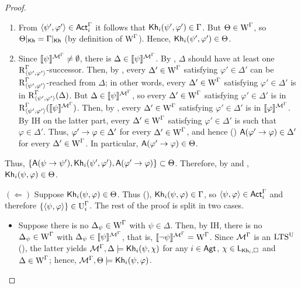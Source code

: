 \begin{proof}
\begin{itemize}
\begin{itemize}
\begin{enumerate}
    \item From $\langle \psi',\varphi' \rangle \in {\rm \sf Act}^\Gamma_i$ it follows that ${\sf Kh}_i(\psi',\varphi') \in \Gamma$.
    But $\Theta \in \operatorname{W}^\Gamma$, so $\Theta\vert_{{\sf Kh}} = \Gamma\vert_{{\sf Kh}}$ (by definition of $\operatorname{W}^\Gamma$).
    Hence, ${\sf Kh}_i(\psi',\varphi') \in \Theta$.

    \item Since $\llbracket \psi \rrbracket^{\mathcal{M}^\Gamma} \neq \emptyset$, there is $\Delta \in \llbracket \psi \rrbracket^{\mathcal{M}^\Gamma}$.
    By , $\Delta$ should have at least one $\operatorname{R}^\Gamma_{\langle \psi',\varphi' \rangle}$-successor.
    Then, by , every $\Delta' \in \operatorname{W}^\Gamma$ satisfying $\varphi' \in \Delta'$ can be $\operatorname{R}^\Gamma_{\langle \psi',\varphi' \rangle}$-reached from $\Delta$; in other words, every $\Delta' \in \operatorname{W}^\Gamma$ satisfying $\varphi' \in \Delta'$ is in $\operatorname{R}^\Gamma_{\langle \psi',\varphi' \rangle}(\Delta)$.
    But $\Delta \in \llbracket \psi \rrbracket^{\mathcal{M}^\Gamma}$, so every $\Delta' \in \operatorname{W}^\Gamma$ satisfying $\varphi' \in \Delta'$ is in $\operatorname{R}^\Gamma_{\langle \psi',\varphi' \rangle}(\llbracket \psi \rrbracket^{\mathcal{M}^\Gamma})$.
    Then, by , every $\Delta' \in \operatorname{W}^\Gamma$ satisfying $\varphi' \in \Delta'$ is in $\llbracket \varphi \rrbracket^{\mathcal{M}^\Gamma}$.
    By IH on the latter part, every $\Delta' \in \operatorname{W}^\Gamma$ satisfying $\varphi' \in \Delta'$ is such that $\varphi \in \Delta'$.
    Thus, $\varphi' \rightarrow \varphi \in \Delta'$ for every $\Delta' \in \operatorname{W}^\Gamma$, and hence () ${\sf A}(\varphi' \rightarrow \varphi) \in \Delta'$ for every $\Delta' \in \operatorname{W}^\Gamma$.
    In particular, ${\sf A}(\varphi' \rightarrow \varphi) \in \Theta$.
\end{enumerate}
Thus, $\{ {\sf A}(\psi \rightarrow \psi'), {\sf Kh}_i(\psi',\varphi'), {\sf A}(\varphi' \rightarrow \varphi) \} \subset \Theta$.
Therefore, by  and , ${\sf Kh}_i(\psi, \varphi) \in \Theta$.
\end{itemize}

$(\Leftarrow)$ Suppose ${\sf Kh}_i(\psi, \varphi) \in \Theta$.
Thus (), ${\sf Kh}_i(\psi, \varphi) \in \Gamma$, so $\langle \psi, \varphi \rangle \in {\rm \sf Act}^\Gamma_i$ and therefore $\{ \langle \psi, \varphi \rangle \} \in \operatorname{U}^\Gamma_i$.
The rest of the proof is split in two cases.
\begin{itemize}
\item Suppose there is no $\Delta_\psi \in \operatorname{W}^\Gamma$ with $\psi \in \Delta$.
Then, by IH, there is no $\Delta_\psi \in \operatorname{W}^\Gamma$ with $\Delta_\psi \in \llbracket \psi \rrbracket^{\mathcal{M}^\Gamma}$, that is, $\llbracket \lnot\psi \rrbracket^{\mathcal{M}^\Gamma} = \operatorname{W}^\Gamma$.
Since $\mathcal{M}^\Gamma$ is an $\textup{LTS$^\text{\textup{U}}$}$ (), the latter yields $\mathcal{M}^\Gamma, \Delta \models {\sf Kh}_i(\psi, \chi)$ for any $i \in {\rm \sf Agt}$, $\chi \in \mathsf{L}_{{\sf Kh}_i,\square}$ and $\Delta \in \operatorname{W}^\Gamma$; hence, $\mathcal{M}^\Gamma, \Theta \models {\sf Kh}_i(\psi, \varphi)$.


\end{itemize}
\end{itemize}
\end{proof}
